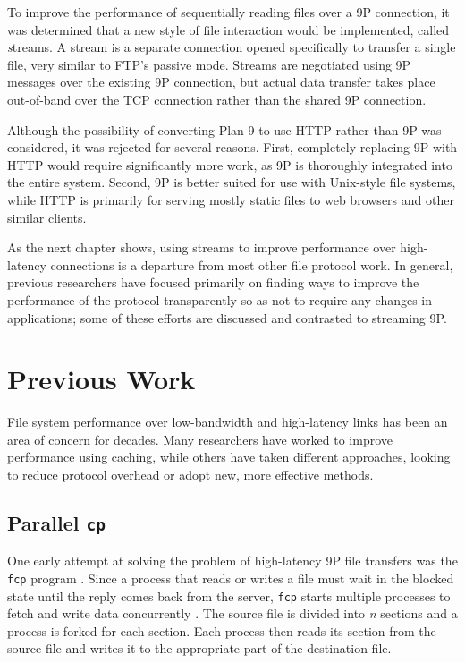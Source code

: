 \documentclass[11pt,american]{report}
\begin{document}
To improve the performance of sequentially reading files over a 9P connection, it was determined that a new style of file interaction would be implemented, called {\emph streams}. A stream is a separate  connection opened specifically to transfer a single file, very similar to FTP's passive mode. Streams are negotiated using 9P messages over the existing 9P connection, but actual data transfer takes place out-of-band over the TCP connection rather than the shared 9P connection.

Although the possibility of converting Plan 9 to use HTTP rather than 9P was considered, it was rejected for several reasons. First, completely replacing 9P with HTTP would require significantly more work, as 9P is thoroughly integrated into the entire system. Second, 9P is better suited for use with Unix-style file systems, while HTTP is primarily for serving mostly static files to web browsers and other similar clients.

As the next chapter shows, using streams to improve performance over high-latency connections is a departure from most other file protocol work. In general, previous researchers have focused primarily on finding ways to improve the performance of the protocol transparently so as not to require any changes in applications; some of these efforts are discussed and contrasted to streaming 9P.

\chapter{Previous Work}
File system performance over low-bandwidth and high-latency links has been an area of concern for decades. Many researchers have worked to improve performance using caching, while others have taken different approaches, looking to reduce protocol overhead or adopt new, more effective methods.

\section{Parallel {\tt cp}}
One early attempt at solving the problem of high-latency 9P file transfers was the {\tt fcp} program \cite{1cp}. Since a process that reads or writes a file must wait in the blocked state until the reply comes back from the server, {\tt fcp} starts multiple processes to fetch and write data concurrently . The source file is divided into {\emph n} sections and a process is forked for each section. Each process then reads its section from the source file and writes it to the appropriate part of the destination file.
\end{document}
